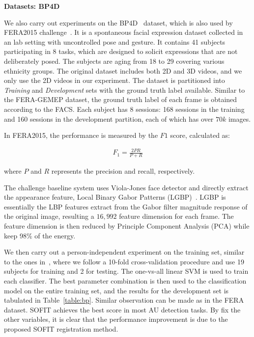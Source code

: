 \documentclass[10pt,journal]{IEEEtran}
\begin{document}
\noindent \textbf{Datasets: BP4D}

We also carry out experiments on the BP4D~\cite{BP4D} dataset, which is also used by FERA2015 challenge~\cite{FERA15}. It is a spontaneous facial expression dataset collected in an lab setting with uncontrolled pose and gesture. It contains 41 subjects participating in 8 tasks, which are designed to solicit expressions that are not deliberately posed. The subjects are aging from 18 to 29 covering various ethnicity groups. The original dataset includes both 2D and 3D videos, and we only use the 2D videos in our experiment. The dataset is partitioned into \textit{Training} and \textit{Development} sets with the ground truth label available. Similar to the FERA-GEMEP dataset, the ground truth label of each frame is obtained according to the FACS. Each subject has 8 sessions: 168 sessions in the training and 160 sessions in the development partition, each of which has over $70k$ images.

In FERA2015, the performance is measured by the $F1$ score, calculated as:

\begin{align}
F_1 = \frac{2PR}{P+R}
\end{align}

\noindent where $P$ and $R$ represents the precision and recall, respectively.

The challenge baseline system uses Viola-Jones face detector and directly extract the appearance feature, Local Binary Gabor Patterns (LGBP)~\cite{LGBP}. LGBP is essentially the LBP features extract from the Gabor filter magnitude response of the original image, resulting a $16,992$ feature dimension for each frame. The feature dimension is then reduced by Principle Component Analysis (PCA) while keep 98\% of the energy. 

We then carry out a person-independent experiment on the training set, similar to the ones in~\cite{BP4D,FERA15}, where we follow a 10-fold cross-validation procedure and use 19 subjects for training and 2 for testing. The one-vs-all linear SVM is used to train each classifier. The best parameter combination is then used to the classification model on the entire training set, and the results for the development set is tabulated in Table~\ref{table:bp}. Similar observation can be made as in the FERA dataset. SOFIT achieves the best score in most AU detection tasks. By fix the other variables, it is clear that the performance improvement is due to the proposed SOFIT registration method.
\end{document}
